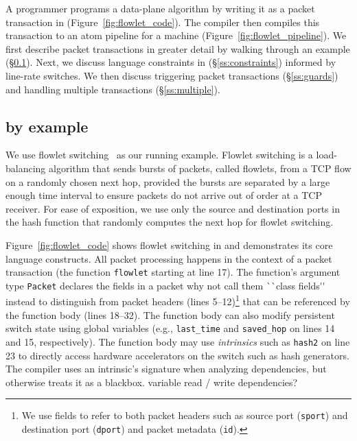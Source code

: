 A programmer programs a data-plane algorithm by writing it as
a packet transaction in \pktlanguage (Figure~\ref{fig:flowlet_code}).  The
\pktlanguage compiler then compiles this transaction to an atom pipeline for a
\absmachine machine (Figure~\ref{fig:flowlet_pipeline}). We first describe
packet transactions in greater detail by walking through an example
(\S\ref{ss:flowlet}). Next, we discuss language constraints in \pktlanguage
(\S\ref{ss:constraints}) informed by line-rate switches.  We then discuss
triggering packet transactions (\S\ref{ss:guards}) and handling multiple
transactions (\S\ref{ss:multiple}).

\subsection{\pktlanguage by example}
\label{ss:flowlet}

We use flowlet switching~\cite{flowlets} as our running example. Flowlet
switching is a load-balancing algorithm that sends bursts of packets, called
flowlets, from a TCP flow on a randomly chosen next hop, provided the bursts
are separated by a large enough time interval to ensure packets do not arrive
out of order at a TCP receiver. For ease of exposition, we use only the source
and destination ports in the hash function that randomly computes the next hop
for flowlet switching.

Figure~\ref{fig:flowlet_code} shows flowlet switching in \pktlanguage and
demonstrates its core language constructs. All packet processing happens in the
context of a packet transaction (the function \texttt{flowlet} starting at line
17). The function's argument type {\tt Packet} declares the fields in a packet
\ac{why not call them ``class fields'' instead to distinguish from packet headers}
(lines 5--12)\footnote{We use fields to refer to both packet headers such as
source port ({\tt sport}) and destination port ({\tt dport}) and packet
metadata ({\tt id}).} that can be referenced by the function body (lines
18--32).  The function body can also modify persistent switch state using
global variables (e.g., \texttt{last\_time} and \texttt{saved\_hop} on lines 14
and 15, respectively). The function body may use \textit{intrinsics} such as
\texttt{hash2} on line 23 to directly access hardware accelerators on the
switch such as hash generators.  The \pktlanguage compiler uses an intrinsic's
signature when analyzing dependencies, but otherwise treats it as a blackbox.
\ac{variable read / write dependencies?}

